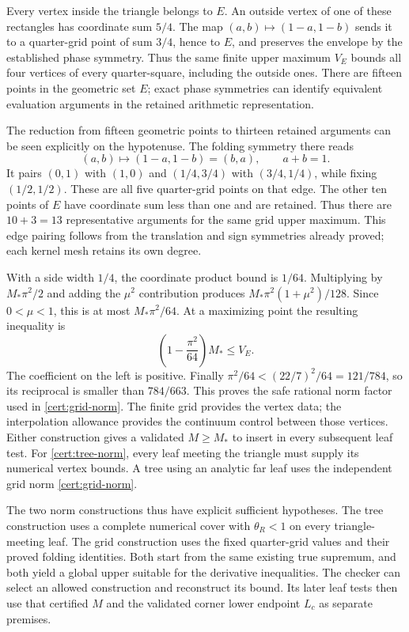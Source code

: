 Every vertex inside the triangle belongs to $E$. An outside vertex
of one of these rectangles has coordinate sum $5/4$. The map
$(a,b)\mapsto(1-a,1-b)$ sends it to a quarter-grid point of sum
$3/4$, hence to $E$, and preserves the envelope by the established
phase symmetry. Thus the same finite upper maximum $V_E$ bounds all
four vertices of every quarter-square, including the outside ones.
There are fifteen points in the geometric set $E$; exact phase
symmetries can identify equivalent evaluation arguments in the
retained arithmetic representation.

The reduction from fifteen geometric points to thirteen retained
arguments can be seen explicitly on the hypotenuse. The folding
symmetry there reads
\[
 (a,b)\longmapsto(1-a,1-b)=(b,a),\qquad a+b=1.
\]
It pairs $(0,1)$ with $(1,0)$ and $(1/4,3/4)$ with
$(3/4,1/4)$, while fixing $(1/2,1/2)$. These are all five
quarter-grid points on that edge. The other ten points of $E$
have coordinate sum less than one and are retained. Thus there
are $10+3=13$ representative arguments for the same grid upper
maximum. This edge pairing follows from the translation and sign
symmetries already proved; each kernel mesh retains its own degree.

With a side width $1/4$, the coordinate product bound is $1/64$.
Multiplying by $M_*\pi^2/2$ and adding the $\mu^2$ contribution
produces $M_*\pi^2(1+\mu^2)/128$. Since $0<\mu<1$, this is at most
$M_*\pi^2/64$. At a maximizing point the resulting inequality is
\[
 \left(1-\frac{\pi^2}{64}\right)M_*\leq V_E.
\]
The coefficient on the left is positive. Finally
$\pi^2/64<(22/7)^2/64=121/784$, so its reciprocal is smaller
than $784/663$. This proves the safe rational norm factor used in
\eqref{cert:grid-norm}. The finite grid provides the vertex data;
the interpolation allowance provides the continuum control between
those vertices.
Either construction gives a
validated $M\geq M_*$ to insert in every subsequent leaf test.
For \eqref{cert:tree-norm}, every leaf meeting the triangle must
supply its numerical vertex bounds. A tree using an analytic far leaf
uses the independent grid norm \eqref{cert:grid-norm}.

The two norm constructions thus have explicit sufficient hypotheses.
The tree construction uses a complete numerical cover with
$\theta_R<1$ on every triangle-meeting leaf. The grid construction
uses the fixed quarter-grid values and their proved folding
identities. Both start from the same existing true supremum, and
both yield a global upper suitable for the derivative inequalities.
The checker can select an allowed construction and reconstruct its
bound. Its later leaf tests then use that certified $M$ and the
validated corner lower endpoint $L_c$ as separate premises.

